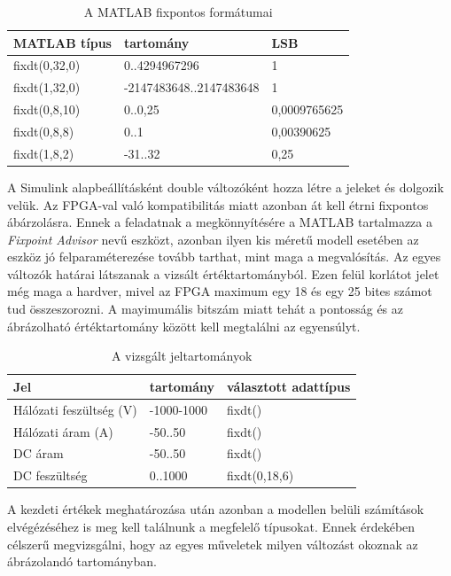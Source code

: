 \begin{table}[]
\centering
\begin{tabular}{|l|l|l|}
\hline
MATLAB típus  & tartomány               & LSB \\ \hline
fixdt(0,32,0) & 0..4294967296           & 1   \\ \hline
fixdt(1,32,0) & -2147483648..2147483648	& 1   \\ \hline
fixdt(0,8,10) & 0..0,25        	   	    & 0,0009765625 \\ \hline
fixdt(0,8,8)  & 0..1     			 	& 0,00390625    \\ \hline
fixdt(1,8,2)  & -31..32     			& 0,25    \\ \hline
\end{tabular}
\caption{A MATLAB fixpontos formátumai}
\label{tab:fixdt}
\end{table}

A Simulink alapbeállításként double változóként hozza létre a jeleket és dolgozik velük. Az FPGA-val való kompatibilitás miatt azonban át kell étrni fixpontos ábárzolásra. Ennek a feladatnak a megkönnyítésére a MATLAB tartalmazza a \emph{Fixpoint Advisor} nevű eszközt, azonban ilyen kis méretű modell esetében az eszköz jó felparaméterezése tovább tarthat, mint maga a megvalósítás. Az egyes változók határai látszanak a vizsált értéktartományból. Ezen felül korlátot jelet még maga a hardver, mivel az FPGA maximum egy 18 és egy 25 bites számot tud összeszorozni. A mayimumális bitszám miatt tehát a pontosság és az ábrázolható értéktartomány között kell megtalálni az egyensúlyt.

\begin{table}[]
\centering
\begin{tabular}{|l|l|l|}
\hline
Jel  					&		 tartomány              & választott adattípus \\ \hline
Hálózati feszültség (V) & -1000-1000          	 		& fixdt()\\ \hline
Hálózati áram (A) 		& -50..50						& fixdt()\\ \hline
DC áram 				& -50..50        	   	   		& fixdt() \\ \hline
DC feszültség  			& 0..1000     			 		& fixdt(0,18,6)    \\ \hline
\end{tabular}
\caption{A vizsgált jeltartományok}
\label{tab:values}
\end{table} 

A kezdeti értékek meghatározása után azonban a modellen belüli számítások elvégézéséhez is meg kell találnunk a megfelelő típusokat. Ennek érdekében célszerű megvizsgálni, hogy az egyes műveletek milyen változást okoznak az ábrázolandó tartományban.

